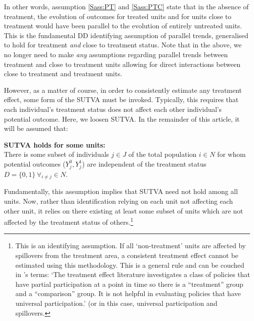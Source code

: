 In other words, assumption \ref{Sass:PT} and \ref{Sass:PTC} state that in the 
absence of treatment, the evolution of outcomes for treated units and for units 
close to treatment would have been parallel to the evolution of entirely 
untreated units.  This is the fundamental DD identifying assumption of parallel 
trends, generalised to hold for treatment \emph{and} close to treatment status.  
Note that in the above, we no longer need to make \emph{any} assumptions 
regarding parallel trends between treatment and close to treatment units 
allowing for direct interactions between close to treatment and treatment units. 

However, as a matter of course, in order to consistently estimate any treatment 
effect, some form of the SUTVA must be invoked.  Typically, this requires that 
each individual's treatment status does not affect each other individual's 
potential outcome.  Here, we loosen SUTVA. In the remainder of this article, it 
will be assumed that:
\begin{assumption}{3}{}
\label{Sass:SUTVAs}
\textbf{SUTVA holds for some units:} \\
There is some subset of individuals $j\in J$ of the total population $i\in N$ 
for whom potential outcomes ($Y_j^0, Y_j^1$) are independent of the treatment 
status $D=\{0,1\}\ \forall_{i\neq j} \in N$.
\end{assumption}
\vspace{-4mm}
\noindent Fundamentally, this assumption implies that SUTVA need not hold among 
all units.  Now, rather than identification relying on each unit not affecting 
each other unit, it relies on there existing at least some subset of units which 
are not affected by the treatment status of others.\footnote{This is an 
identifying assumption. If all `non-treatment' units are affected by spillovers 
from the treatment area, a consistent treatment effect cannot be estimated using 
this methodology. This is a general rule and can be couched in 
\citet{HeckmanVytlacil2005}'s terms: `The treatment effect literature 
investigates a class of policies that have partial participation at a point in 
time so there is a ``treatment'' group and a ``comparison'' group. It is not 
helpful in evaluating policies that have universal participation.' (or in this 
case, universal participation and spillovers.}

